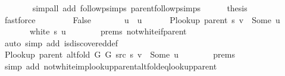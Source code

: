 \begin{isabellebody}
\ \ \ \ \ \ \isamarkupfalse%
\ {\isacharparenleft}{\kern0pt}simp{\isacharunderscore}{\kern0pt}all\ add{\isacharcolon}{\kern0pt}\ follow{\isacharunderscore}{\kern0pt}psimps\ parent{\isachardot}{\kern0pt}follow{\isacharunderscore}{\kern0pt}psimps{\isacharparenright}{\kern0pt}\isanewline
\ \ \ \ \isamarkupfalse%
\ {\isacharquery}{\kern0pt}thesis\isanewline
\ \ \ \ \ \ \isamarkupfalse%
\ fastforce\isanewline
\ \ \isamarkupfalse%
\isanewline
\ \ \ \ \isamarkupfalse%
\ False\isanewline
\ \ \ \ \isamarkupfalse%
\ \isamarkupfalse%
\ u\ \ u{\isacharcolon}{\kern0pt}\isanewline
\ \ \ \ \ \ {\isachardoublequoteopen}P{\isacharunderscore}{\kern0pt}lookup\ {\isacharparenleft}{\kern0pt}parent\ s{\isacharparenright}{\kern0pt}\ v\ {\isacharequal}{\kern0pt}\ Some\ u{\isachardoublequoteclose}\isanewline
\ \ \ \ \ \ {\isachardoublequoteopen}{\isasymnot}\ white\ s\ u{\isachardoublequoteclose}\isanewline
\ \ \ \ \ \ \isamarkupfalse%
\ {\isachardoublequoteopen}{}{\isachardot}{\kern0pt}prems{\isachardoublequoteclose}{\isacharparenleft}{\kern0pt}{}{\isacharparenright}{\kern0pt}\ not{\isacharunderscore}{\kern0pt}white{\isacharunderscore}{\kern0pt}if{\isacharunderscore}{\kern0pt}parent\isanewline
\ \ \ \ \ \ \isamarkupfalse%
\ {\isacharparenleft}{\kern0pt}auto\ simp\ add{\isacharcolon}{\kern0pt}\ is{\isacharunderscore}{\kern0pt}discovered{\isacharunderscore}{\kern0pt}def{\isacharparenright}{\kern0pt}\isanewline
\ \ \ \ \isamarkupfalse%
\ \isamarkupfalse%
\ {\isachardoublequoteopen}P{\isacharunderscore}{\kern0pt}lookup\ {\isacharparenleft}{\kern0pt}parent\ {\isacharparenleft}{\kern0pt}alt{\isacharunderscore}{\kern0pt}fold\ G{}\ G{}\ src\ s{\isacharparenright}{\kern0pt}{\isacharparenright}{\kern0pt}\ v\ {\isacharequal}{\kern0pt}\ Some\ u{\isachardoublequoteclose}\isanewline
\ \ \ \ \ \ \isamarkupfalse%
\ {\isachardoublequoteopen}{}{\isachardot}{\kern0pt}prems{\isachardoublequoteclose}\isanewline
\ \ \ \ \ \ \isamarkupfalse%
\ {\isacharparenleft}{\kern0pt}simp\ add{\isacharcolon}{\kern0pt}\ not{\isacharunderscore}{\kern0pt}white{\isacharunderscore}{\kern0pt}imp{\isacharunderscore}{\kern0pt}lookup{\isacharunderscore}{\kern0pt}parent{\isacharunderscore}{\kern0pt}alt{\isacharunderscore}{\kern0pt}fold{\isacharunderscore}{\kern0pt}eq{\isacharunderscore}{\kern0pt}lookup{\isacharunderscore}{\kern0pt}parent{\isacharparenright}{\kern0pt}\isanewline

\end{isabellebody}
